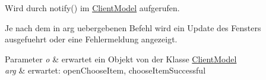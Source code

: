 Wird durch notify() im \hyperlink{a00003}{Client\-Model} aufgerufen. 

Je nach dem in arg uebergebenen Befehl wird ein Update des Fensters ausgefuehrt oder eine Fehlermeldung angezeigt.


\begin{DoxyParams}{Parameter}
{\em o} & erwartet ein Objekt von der Klasse \hyperlink{a00003}{Client\-Model} \\
\hline
{\em arg} & erwartet\-: open\-Choose\-Item, choose\-Item\-Successful \\
\hline
\end{DoxyParams}
